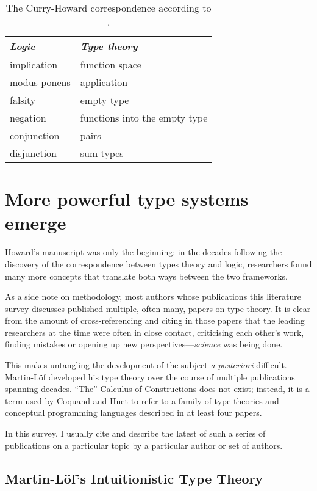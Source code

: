 \documentclass[12pt,toc=bibliography,numbers=noendperiod,
               footnotes=multiple,twoside]{scrartcl}
\begin{document}
\begin{table}[h]
    \centering
    \begin{tabular}{l l}
        \toprule
        \textit{Logic} & \textit{Type theory} \\
        \midrule
	implication & function space \\
	modus ponens & application \\
	falsity & empty type \\
	negation & functions into the empty type \\
	conjunction & pairs \\
	disjunction & sum types \\
        \bottomrule
    \end{tabular}
    \caption{The Curry-Howard correspondence according to \textcite{howard_formulae-as-types_1980}.}
    \label{tab:howard}
\end{table}


\section{More powerful type systems emerge}

Howard's manuscript was only the beginning: in the decades following the discovery of the correspondence between types theory and logic, researchers found many more concepts that translate both ways between the two frameworks.

As a side note on methodology, most authors whose publications this literature survey discusses published multiple, often many, papers on type theory. It is clear from the amount of cross-referencing and citing in those papers that the leading researchers at the time were often in close contact, criticising each other's work, finding mistakes or opening up new perspectives---\emph{science} was being done.

This makes untangling the development of the subject \emph{a posteriori} difficult. Martin-Löf developed his type theory over the course of multiple publications spanning decades. \enquote{The} Calculus of Constructions does not exist; instead, it is a term used by Coquand and Huet to refer to a family of type theories and conceptual programming languages described in at least four papers.

In this survey, I usually cite and describe the latest of such a series of publications on a particular topic by a particular author or set of authors.

\subsection{Martin-Löf's Intuitionistic Type Theory}
\end{document}
